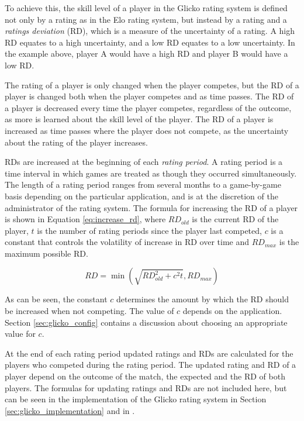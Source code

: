 To achieve this, the skill level of a player in the Glicko rating system is defined not only by a rating as in the Elo rating system, but instead by a rating and a \emph{ratings deviation} (RD), which is a measure of the uncertainty of a rating.
A high RD equates to a high uncertainty, and a low RD equates to a low uncertainty.
In the example above, player A would have a high RD and player B would have a low RD.

The rating of a player is only changed when the player competes, but the RD of a player is changed both when the player competes and as time passes.
The RD of a player is decreased every time the player competes, regardless of the outcome, as more is learned about the skill level of the player.
The RD of a player is increased as time passes where the player does not compete, as the uncertainty about the rating of the player increases.

RDs are increased at the beginning of each \emph{rating period}.
A rating period is a time interval in which games are treated as though they occurred simultaneously.
The length of a rating period ranges from several months to a game-by-game basis depending on the particular application, and is at the discretion of the administrator of the rating system.
The formula for increasing the RD of a player is shown in Equation \ref{eq:increase_rd}, where $RD_{old}$ is the current RD of the player, $t$ is the number of rating periods since the player last competed, $c$ is a constant that controls the volatility of increase in RD over time and $RD_{max}$ is the maximum possible RD.

\begin{equation} \label{eq:increase_rd}
RD = \min \left( \sqrt{RD_{old}^2 + c^2t}, RD_{max} \right)
\end{equation}

As can be seen, the constant $c$ determines the amount by which the RD should be increased when not competing.
The value of $c$ depends on the application.
Section \ref{sec:glicko_config} contains a discussion about choosing an appropriate value for $c$.

At the end of each rating period updated ratings and RDs are calculated for the players who competed during the rating period.
The updated rating and RD of a player depend on the outcome of the match, the expected and the RD of both players.
The formulas for updating ratings and RDs are not included here, but can be seen in the implementation of the Glicko rating system in Section \ref{sec:glicko_implementation} and in \cite{glicko}.


